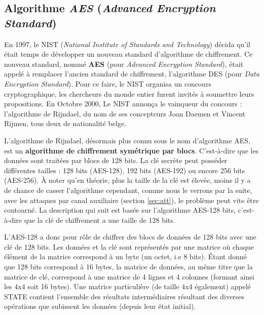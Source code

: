 \documentclass[10pt, oneside, a4paper]{article}
\begin{document}
\subsection{Algorithme \textit{AES} (\textit{Advanced Encryption Standard})}
\label{sec:AES}

En 1997, le NIST (\textit{National Institute of Standards and Technology}) décida qu'il était temps de développer un nouveau standard d'algorithme de chiffrement. Ce nouveau standard, nommé \textbf{AES} (pour \textit{Advanced Encryption Standard}), était appelé à remplacer l'ancien standard de chiffrement, l'algorithme DES (pour \textit{Data Encryption Standard}). Pour ce faire, le NIST organisa un concours cryptographique, les chercheurs du monde entier furent invités à soumettre leurs propositions. En Octobre 2000, Le NIST annonça le vainqueur du concours : l'algorithme de Rijndael, du nom de ses concepteurs Joan Daemen et Vincent Rijmen, tous deux de nationalité belge.

L'algorithme de Rijndael, désormais plus connu sous le nom d'algorithme AES, est un \textbf{algorithme de chiffrement symétrique par blocs}. C'est-à-dire que les données sont traitées par blocs de 128 bits. La clé secrète peut posséder différentes tailles : 128 bits (AES-128), 192 bits (AES-192) ou encore 256 bits (AES-256). À noter qu'en théorie, plus la taille de la clé est élevée, moins il y a de chance de casser l'algorithme cependant,  comme nous le verrons par la suite, avec les attaques par canal auxiliaire (section \ref{sec:att}), le problème peut vite être contourné. La description qui suit est basée sur l'algorithme AES-128 bits, c'est-à-dire que la clé de chiffrement a une taille de 128 bits.

L'AES-128 a donc pour rôle de chiffrer des blocs de données de 128 bits avec une clé de 128 bits. Les données et la clé sont représentés par une matrice où chaque élément de la matrice correspond à un byte (un octet, i.e 8 bits). Étant donné que 128 bits correspond à 16 bytes, la matrice de données, au même titre que la matrice de clé, correspond à une matrice de 4 lignes et 4 colonnes (formant ainsi les 4x4 soit 16 bytes). Une matrice particulière (de taille 4x4 également) appelé STATE contient l'ensemble des résultats intermédiaires résultant des diverses opérations que subissent les données (depuis leur état initial). 
\end{document}
